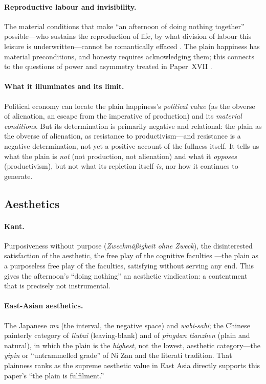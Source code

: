 \paragraph{Reproductive labour and invisibility.} The material conditions that make ``an afternoon of doing nothing together'' possible---who sustains the reproduction of life, by what division of labour this leisure is underwritten---cannot be romantically effaced \parencite{federici2004}. The plain happiness has material preconditions, and honesty requires acknowledging them; this connects to the questions of power and asymmetry treated in Paper~XVII \parencite{paperxvii}.

\paragraph{What it illuminates and its limit.} Political economy can locate the plain happiness's \emph{political value} (as the obverse of alienation, an escape from the imperative of production) and its \emph{material conditions}. But its determination is primarily negative and relational: the plain as the obverse of alienation, as resistance to productivism---and resistance is a negative determination, not yet a positive account of the fullness itself. It tells us what the plain is \emph{not} (not production, not alienation) and what it \emph{opposes} (productivism), but not what its repletion itself \emph{is}, nor how it continues to generate.

\subsection{Aesthetics}
\label{p19:sub:theories-aesthetics}

\paragraph{Kant.} Purposiveness without purpose (\emph{Zweckmäßigkeit ohne Zweck}), the disinterested satisfaction of the aesthetic, the free play of the cognitive faculties \parencite{kant1987}---the plain as a purposeless free play of the faculties, satisfying without serving any end. This gives the afternoon's ``doing nothing'' an aesthetic vindication: a contentment that is precisely not instrumental.

\paragraph{East-Asian aesthetics.} The Japanese \emph{ma} (the interval, the negative space) and \emph{wabi-sabi}; the Chinese painterly category of \emph{liubai} (leaving-blank) and of \emph{pingdan tianzhen} (plain and natural), in which the plain is the \emph{highest}, not the lowest, aesthetic category---the \emph{yipin} or ``untrammelled grade'' of Ni Zan and the literati tradition. That plainness ranks as the supreme aesthetic value in East Asia directly supports this paper's ``the plain is fulfilment.''

